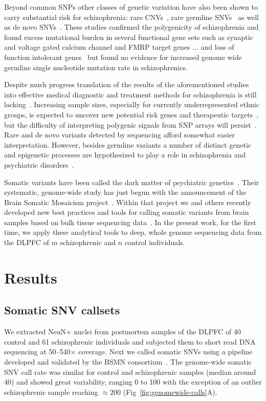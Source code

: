 \documentclass[letterpaper]{article}
\begin{document}
Beyond common SNPs other classes of genetic variation have also been shown to
carry substantial risk for schizophrenia: rare CNVs~\citep{Rees2014}, rare germline
SNVs~\citep{Purcell2014,Singh2017} as well as de novo
SNVs~\citep{Fromer2014,Rees2020}.  These studies confirmed the polygenicity of
schizophrenia and found excess mutational burden in several functional
gene sets such as synaptic and voltage gated calcium channel and FMRP target
genes\citep{Fromer2014,Purcell2014} ... and loss of function intolerant
genes~\citep{Rees2020,Singh2017} but found no evidence for increased genome
wide germline single nucleotide mutation rate in schizophrenics.

Despite much progress translation of the results of the aforementioned studies
into effective medical diagnostic and treatment methods for schizophrenia is
still lacking~\citep{Breen2016,Foley2017}. Increasing sample sizes, especially
for currently underrepresented ethnic groups, is expected to uncover new
potential risk genes and therapeutic targets~\citep{Visscher2017}, but the difficulty of interpreting
polygenic signals from SNP arrays will persist~\citep{Boyle2017}.  Rare and de
novo variants detected by sequencing afford somewhat easier interpretation.
However, besides germline variants a number of distinct genetic and epigenetic
processes are hypothesized to play a role in schizophrenia and psychiatric
disorders~\citep{PsychENCODEConsortium2015}.

Somatic variants have been called the dark matter of psychiatric
genetics~\citep{Insel2014}.  Their systematic, genome-wide study has just begun
with the announcement of the Brain Somatic Mosaicism
project~\citep{McConnell2017}.  Within that project we and others recently
developed new best practices and tools for calling somatic variants from brain
samples based on bulk tissue sequencing data~\citep{Wang2021}.  In the present
work, for the first time, we apply these analytical tools to deep, whole
genome sequencing data from the DLPFC of \(m\) schizophrenic and \(n\) control
individuals.

\section*{Results}

\subsection*{Somatic SNV callsets}

We extracted NeuN+ nuclei from postmortem samples of the DLPFC of 40 control
and 61 schizophrenic individuals and subjected them to short read DNA
sequencing at 50--540\(\times\) coverage.  Next we called somatic SNVs using a
pipeline developed and validated by the BSMN consortium~\citep{Wang2021}.  The
genome-wide somatic SNV call rate was similar for control and schizophrenic
samples (median around 40) and showed great variability, ranging 0 to 100 with
the exception of an outlier schizophrenic sample reaching \(\approx 200\)
(Fig~\ref{fig:genomewide-calls}A).
\end{document}
